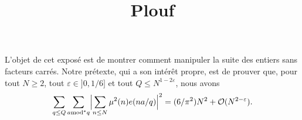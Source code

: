 \documentclass[12pt]{article}
\title{Plouf
}
\author{
}
\let\ve=\varepsilon
\def\Ocal{\mathcal{O}}
\newcommand{\mode}{\textrm{mod}^*}
\begin{document}
%
%
L'objet de cet expos\'e est de montrer comment manipuler la suite
      des entiers sans facteurs carr\'es. Notre pr\'etexte, qui a
      son int\'er\^et propre, est de prouver que, pour tout $N\ge 2$, tout
      $\ve\in]0,1/6]$ et tout $Q\le N^{1-2\ve}$, nous avons
      \begin{equation*}
        \sum_{q\le Q}\sum_{a\mode q}\Bigl|
        \sum_{n\le N}\mu^2(n)e(na/q)
        \Bigr|^2=(6/\pi^2)N^2+\Ocal(N^{2-\ve}).
      \end{equation*}
\end{document}
